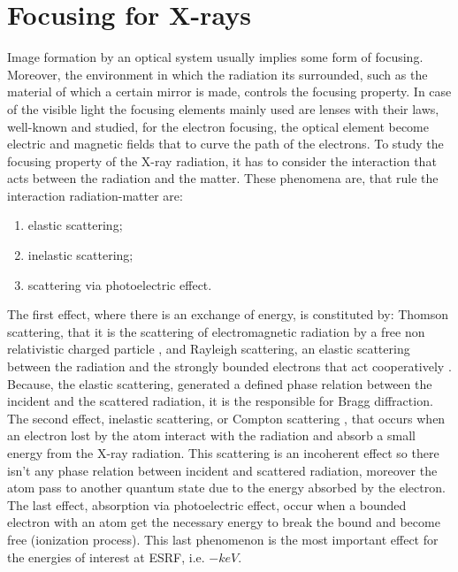 \chapter{Focusing for X-rays}
\label{Introduzione}

\thispagestyle{empty}
Image formation by an optical system usually implies some form of focusing. Moreover, the environment in which the radiation its surrounded, such as the material of which a certain mirror is made, controls the focusing property. In case of the visible light the focusing elements mainly used are lenses with their laws, well-known and studied, for the electron focusing, the optical element become electric and magnetic fields that to curve the path of the electrons. To study the focusing property of the X-ray radiation, it has to consider the interaction that acts between the radiation and the matter. These phenomena are, that rule the interaction radiation-matter are:
\begin{enumerate}
\item elastic scattering;
\item inelastic scattering;
\item scattering via photoelectric effect.
\end{enumerate}
The first effect, where there is an exchange of energy, is constituted by: Thomson scattering, that it is the scattering of electromagnetic radiation by a free non relativistic charged particle \cite{ThomsonScattering}, and Rayleigh scattering, an elastic scattering between the radiation and the strongly bounded electrons that act cooperatively \cite{RayleighScattering}. Because, the elastic scattering, generated a defined phase relation between the incident and the scattered radiation, it is the responsible for Bragg diffraction. The second effect, inelastic scattering, or Compton scattering \cite{ComptonScattering}, that occurs when an electron lost by the atom interact with the radiation and absorb a small energy from the X-ray radiation. This scattering is an incoherent effect so there isn't any phase relation between incident and scattered radiation, moreover the atom pass to another quantum state due to the energy absorbed by the electron. The last effect, absorption via photoelectric effect, occur when a bounded electron with an atom get the necessary energy to break the bound and become free (ionization process). This last phenomenon is the most important effect for the energies of interest at ESRF, i.e. $- keV $.
%
